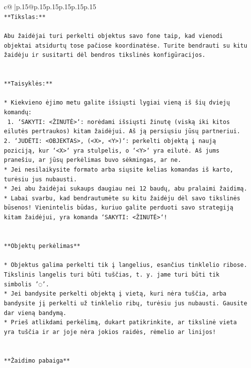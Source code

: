\documentclass{article}
\begin{document}
{\begin{supertabular}{c@{$\;$}|p{.15\linewidth}@{}p{.15\linewidth}p{.15\linewidth}p{.15\linewidth}p{.15\linewidth}p{.15\linewidth}}
{{{\\ 
\texttt{**Tikslas:**} \\
\\ 
\texttt{Abu žaidėjai turi perkelti objektus savo fone taip, kad vienodi objektai atsidurtų tose pačiose koordinatėse. Turite bendrauti su kitu žaidėju ir susitarti dėl bendros tikslinės konfigūracijos.} \\
\\ 
\\ 
\texttt{**Taisyklės:**} \\
\\ 
\texttt{* Kiekvieno ėjimo metu galite išsiųsti lygiai vieną iš šių dviejų komandų:} \\
\texttt{ 1. `SAKYTI: <ŽINUTĖ>`: norėdami išsiųsti žinutę (viską iki kitos eilutės pertraukos) kitam žaidėjui. Aš ją persiųsiu jūsų partneriui.} \\
\texttt{2. `JUDĖTI: <OBJEKTAS>, (<X>, <Y>)`: perkelti objektą į naują poziciją, kur `<X>` yra stulpelis, o `<Y>` yra eilutė. Aš jums pranešiu, ar jūsų perkėlimas buvo sėkmingas, ar ne.} \\
\texttt{* Jei nesilaikysite formato arba siųsite kelias komandas iš karto, turėsiu jus nubausti.} \\
\texttt{* Jei abu žaidėjai sukaups daugiau nei 12 baudų, abu pralaimi žaidimą.} \\
\texttt{* Labai svarbu, kad bendrautumėte su kitu žaidėju dėl savo tikslinės būsenos! Vienintelis būdas, kuriuo galite perduoti savo strategiją kitam žaidėjui, yra komanda `SAKYTI: <ŽINUTĖ>`!} \\
\\ 
\\ 
\texttt{**Objektų perkėlimas**} \\
\\ 
\texttt{* Objektus galima perkelti tik į langelius, esančius tinklelio ribose. Tikslinis langelis turi būti tuščias, t. y. jame turi būti tik simbolis '◌'.} \\
\texttt{* Jei bandysite perkelti objektą į vietą, kuri nėra tuščia, arba bandysite jį perkelti už tinklelio ribų, turėsiu jus nubausti. Gausite dar vieną bandymą.} \\
\texttt{* Prieš atlikdami perkėlimą, dukart patikrinkite, ar tikslinė vieta yra tuščia ir ar joje nėra jokios raidės, rėmelio ar linijos!} \\
\\ 
\\ 
\texttt{**Žaidimo pabaiga**} \\
\\ 
}}}
\end{supertabular}}
\end{document}
